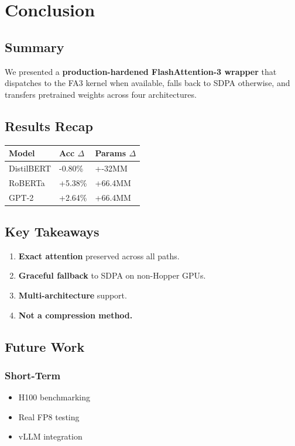 \section{Conclusion}

\subsection{Summary}

We presented a \textbf{production-hardened FlashAttention-3 wrapper} that 
dispatches to the FA3 kernel when available, falls back to SDPA otherwise, 
and transfers pretrained weights across four architectures.

\subsection{Results Recap}

\begin{table}[H]
\centering
\small
\begin{tabular}{lll}
\toprule
\textbf{Model} & \textbf{Acc $\Delta$} & \textbf{Params $\Delta$} \\
\midrule
DistilBERT & -0.80\% & +-32MM \\
RoBERTa & +5.38\% & +66.4MM \\
GPT-2 & +2.64\% & +66.4MM \\
\bottomrule
\end{tabular}
\end{table}

\subsection{Key Takeaways}

\begin{enumerate}
\item \textbf{Exact attention} preserved across all paths.
\item \textbf{Graceful fallback} to SDPA on non-Hopper GPUs.
\item \textbf{Multi-architecture} support.
\item \textbf{Not a compression method.}

\end{enumerate}
\subsection{Future Work}

\subsubsection{Short-Term}
\begin{itemize}
\item H100 benchmarking
\item Real FP8 testing
\item vLLM integration

\end{itemize}
